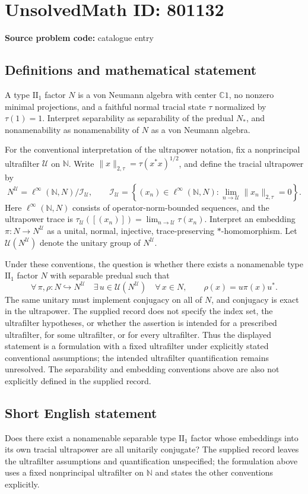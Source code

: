 \documentclass[11pt]{article}
\newcommand{\N}{\mathbb{N}}
\newcommand{\C}{\mathbb{C}}
\begin{document}
\section*{UnsolvedMath ID: 801132}
\textbf{Source problem code:} catalogue entry
\subsection{Definitions and mathematical statement}
A type \(\mathrm{II}_1\) factor \(N\) is a von Neumann algebra with center \(\C 1\), no nonzero minimal projections, and a faithful normal tracial state \(\tau\) normalized by \(\tau(1)=1\). Interpret separability as separability of the predual \(N_*\), and nonamenability as nonamenability of \(N\) as a von Neumann algebra.

For the conventional interpretation of the ultrapower notation, fix a nonprincipal ultrafilter \(\mathcal U\) on \(\N\). Write \(\|x\|_{2,\tau}=\tau(x^*x)^{1/2}\), and define the tracial ultrapower by
\[
N^{\mathcal U}=\ell^\infty(\N,N)\big/\mathcal I_{\mathcal U},\qquad
\mathcal I_{\mathcal U}=\left\{(x_n)\in\ell^\infty(\N,N):\lim_{n\to\mathcal U}\|x_n\|_{2,\tau}=0\right\}.
\]
Here \(\ell^\infty(\N,N)\) consists of operator-norm-bounded sequences, and the ultrapower trace is \(\tau_{\mathcal U}([(x_n)])=\lim_{n\to\mathcal U}\tau(x_n)\). Interpret an embedding \(\pi:N\to N^{\mathcal U}\) as a unital, normal, injective, trace-preserving \(*\)-homomorphism. Let \(\mathcal U(N^{\mathcal U})\) denote the unitary group of \(N^{\mathcal U}\).

Under these conventions, the question is whether there exists a nonamenable type \(\mathrm{II}_1\) factor \(N\) with separable predual such that
\[
\forall\,\pi,\rho:N\hookrightarrow N^{\mathcal U}\quad
\exists\,u\in\mathcal U(N^{\mathcal U})\quad
\forall\,x\in N,\qquad \rho(x)=u\pi(x)u^*.
\]
The same unitary must implement conjugacy on all of \(N\), and conjugacy is exact in the ultrapower. The supplied record does not specify the index set, the ultrafilter hypotheses, or whether the assertion is intended for a prescribed ultrafilter, for some ultrafilter, or for every ultrafilter. Thus the displayed statement is a formulation with a fixed ultrafilter under explicitly stated conventional assumptions; the intended ultrafilter quantification remains unresolved. The separability and embedding conventions above are also not explicitly defined in the supplied record.
\subsection{Short English statement}
Does there exist a nonamenable separable type \(\mathrm{II}_1\) factor whose embeddings into its own tracial ultrapower are all unitarily conjugate? The supplied record leaves the ultrafilter assumptions and quantification unspecified; the formulation above uses a fixed nonprincipal ultrafilter on \(\N\) and states the other conventions explicitly.
\end{document}
